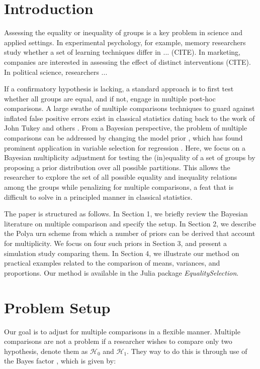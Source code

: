 \documentclass[11pt,a4paper]{article}
\theoremstyle{definition} %
\theoremstyle{case}
\begin{document}
\section{Introduction}
Assessing the equality or inequality of groups is a key problem in science and applied settings. In experimental psychology, for example, memory researchers study whether a set of learning techniques differ in ... (CITE). In marketing, companies are interested in assessing the effect of distinct interventions (CITE). In political science, researchers ...

If a confirmatory hypothesis is lacking, a standard approach is to first test whether all groups are equal, and if not, engage in multiple post-hoc comparisons. A large swathe of multiple comparisons techniques to guard against inflated false positive errors exist in classical statistics dating back to the work of John Tukey and others \parencite[][]{rao2009multiple, benjamini2002john}. From a Bayesian perspective, the problem of multiple comparisons can be addressed by changing the model prior \parencite{jeffreys1961theory, westfall1997bayesian, berry1999bayesian}, which has found prominent application in variable selection for regression \parencite[e.g.,][]{scott2006exploration, scott2010bayes}. Here, we focus on a Bayesian multiplicity adjustment for testing the (in)equality of a set of groups by proposing a prior distribution over all possible partitions. This allows the researcher to explore the set of all possible equality and inequality relations among the groups while penalizing for multiple comparisons, a feat that is difficult to solve in a principled manner in classical statistics.

The paper is structured as follows. In Section 1, we briefly review the Bayesian literature on multiple comparison and specify the setup. In Section 2, we describe the Polya urn scheme from which a number of priors can be derived that account for multiplicity. We focus on four such priors in Section 3, and present a simulation study comparing them. In Section 4, we illustrate our method on practical examples related to the comparison of means, variances, and proportions. Our method is available in the Julia package \textit{EqualitySelection}.


\section{Problem Setup}
Our goal is to adjust for multiple comparisons in a flexible manner. Multiple comparisons are not a problem if a researcher wishes to compare only two hypothesis, denote them as $\mathcal{H}_0$ and $\mathcal{H}_1$. They way to do this is through use of the Bayes factor \parencite[e.g.,][]{kass1995bayes, ly2016harold}, which is given by:
\end{document}
